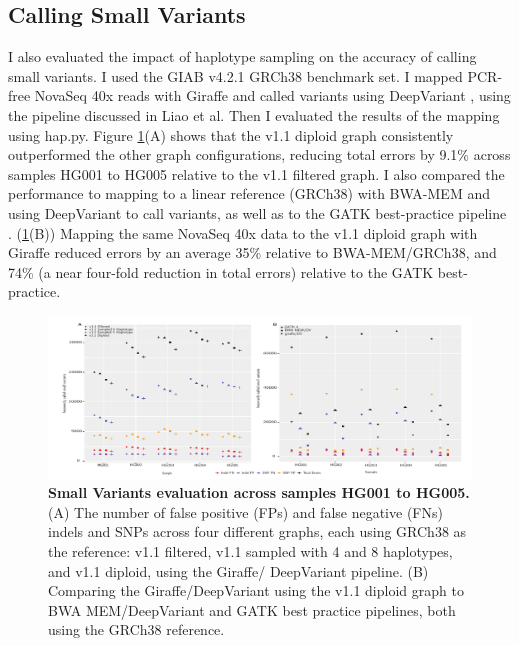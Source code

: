 \documentclass[11pt]{ucthesis}
\begin{document}
\subsection{Calling Small Variants}

I also evaluated the impact of haplotype sampling on the accuracy of calling small variants. I used the GIAB v4.2.1 GRCh38 benchmark set. I mapped PCR-free NovaSeq 40x \cite{wagner2022benchmarking} reads with Giraffe and called variants using DeepVariant \cite{poplin2018universal}, using the pipeline discussed in Liao et al. \cite{liao2023draft} Then I evaluated the results of the mapping using hap.py. Figure \ref{fig:1:3}(A) shows that the v1.1 diploid graph consistently outperformed the other graph configurations, reducing total errors by 9.1\% across samples HG001 to HG005 relative to the v1.1 filtered graph. I also compared the performance to mapping to a linear reference (GRCh38) with BWA-MEM \cite{li2013aligning} and using DeepVariant to call variants, as well as to the GATK best-practice pipeline \cite{poplin2017scaling}. (\ref{fig:1:3}(B))
Mapping the same NovaSeq 40x data to the v1.1 diploid graph with Giraffe reduced errors by an average 35\% relative to BWA-MEM/GRCh38, and 74\% (a near four-fold reduction in total errors) relative to the GATK best-practice.
\begin{figure}[h]
    \centering
    \includegraphics[width=\linewidth]{Images/figure3-1.pdf}
    \caption[Small Variants evaluation across samples HG001 to HG005]{\textbf{Small Variants evaluation across samples HG001 to HG005.} (A) The number of false
positive (FPs) and false negative (FNs) indels and SNPs across four different graphs, each using GRCh38
as the reference: v1.1 filtered, v1.1 sampled with 4 and 8 haplotypes, and v1.1 diploid, using the Giraffe/
DeepVariant pipeline. (B) Comparing the Giraffe/DeepVariant using the v1.1 diploid graph to BWA
MEM/DeepVariant and GATK best practice pipelines, both using the GRCh38 reference.}
    \label{fig:1:3}
\end{figure}
\end{document}
